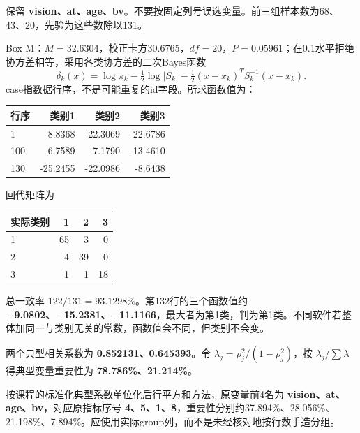 保留 \textbf{vision、at、age、bv}。不要按固定列号误选变量。前三组样本数为68、43、20，先验为这些数除以131。

Box M：\(M=32.6304\)，校正卡方30.6765，\(df=20\)，\(P=0.05961\)；在0.1水平拒绝协方差相等，采用各类协方差的二次Bayes函数 \[\delta_k(x)=\log\pi_k-\tfrac12\log|S_k|-\tfrac12(x-\bar x_k)^TS_k^{-1}(x-\bar x_k).\] case指数据行序，不是可能重复的id字段。所求函数值为：

\begin{center}\small\setlength{\tabcolsep}{4pt}\renewcommand{\arraystretch}{1.18}\begin{tabular}{@{}lrrr@{}}
\toprule
行序 & 类别1 & 类别2 & 类别3 \\
\midrule

1 & -8.8368 & -22.3069 & -22.6786 \\
100 & -6.7589 & -7.1790 & -13.4610 \\
130 & -25.2455 & -22.0986 & -8.6438 \\
\bottomrule\end{tabular}\end{center}

回代矩阵为

\begin{center}\small\setlength{\tabcolsep}{4pt}\renewcommand{\arraystretch}{1.18}\begin{tabular}{@{}lrrr@{}}
\toprule
实际类别 & 1 & 2 & 3 \\
\midrule

1 & 65 & 3 & 0 \\
2 & 4 & 39 & 0 \\
3 & 1 & 1 & 18 \\
\bottomrule\end{tabular}\end{center}

总一致率 \(122/131=93.1298\%\)。第132行的三个函数值约 \textbf{−9.0802、−15.2381、−11.1166}，最大者为第1类，判为第1类。不同软件若整体加同一与类别无关的常数，函数值会不同，但类别不会变。



两个典型相关系数为 \textbf{0.852131、0.645393}。令 \(\lambda_j=\rho_j^2/(1-\rho_j^2)\)，按 \(\lambda_j/\sum\lambda\) 得典型变量重要性为 \textbf{78.786\%、21.214\%}。

按课程的标准化典型系数单位化后行平方和方法，原变量前4名为 \textbf{vision、at、age、bv}，对应原指标序号 \textbf{4、5、1、8}，重要性分别约37.894\%、28.056\%、21.198\%、7.894\%。应使用实际group列，而不是未经核对地按行数手造分组。


